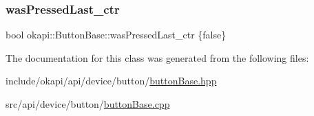 \subsubsection{\texorpdfstring{wasPressedLast\_ctr}{wasPressedLast\_ctr}}
{\footnotesize\ttfamily bool okapi\+::\+Button\+Base\+::was\+Pressed\+Last\+\_\+ctr \{false\}\hspace{0.3cm}{\ttfamily [protected]}}



The documentation for this class was generated from the following files\+:\begin{DoxyCompactItemize}
\item 
include/okapi/api/device/button/\mbox{\hyperlink{buttonBase_8hpp}{button\+Base.\+hpp}}\item 
src/api/device/button/\mbox{\hyperlink{buttonBase_8cpp}{button\+Base.\+cpp}}\end{DoxyCompactItemize}
